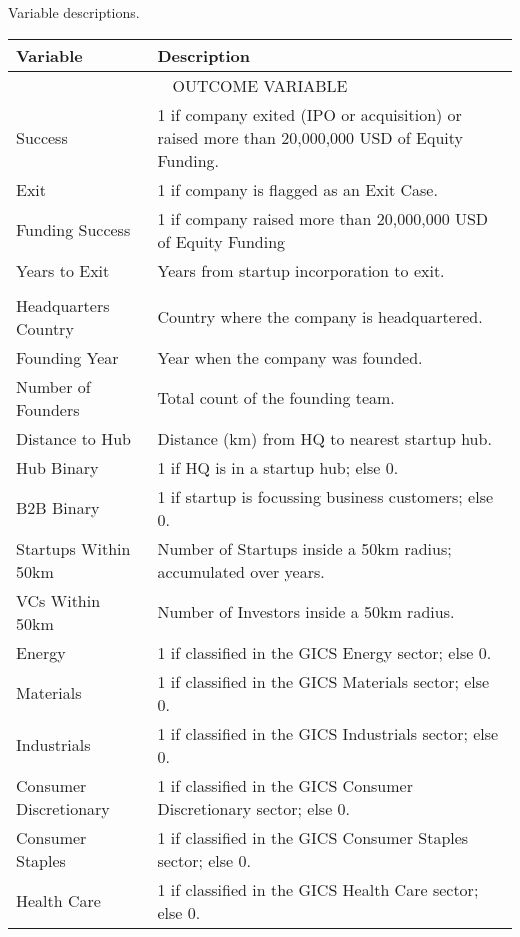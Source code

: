 \centering
{\footnotesize
\caption{Variable descriptions.}
\label{tab:var_desc}
\begin{tabular}{p{} p{}}
\toprule
Variable & Description \\
\midrule
\multicolumn{2}{c}{\tiny\textsc{OUTCOME VARIABLE}} \\
\midrule
Success & 1 if company exited (IPO or acquisition) or raised more than 20,000,000 USD of Equity Funding. \\[0.4em]
Exit & 1 if company is flagged as an Exit Case. \\[0.4em]
Funding Success & 1 if company raised more than 20,000,000 USD of Equity Funding \\[0.4em]
Years to Exit & Years from startup incorporation to exit. \\[0.4em]
\addlinespace[0.5em]
\midrule
\multicolumn{2}{c}{\tiny\textsc{FUNDAMENTAL VARIABLES}} \\
\midrule
Headquarters Country & Country where the company is headquartered. \\[0.4em]
Founding Year & Year when the company was founded. \\[0.4em]
Number of Founders & Total count of the founding team. \\[0.4em]
Distance to Hub & Distance (km) from HQ to nearest startup hub. \\[0.4em]
Hub Binary & 1 if HQ is in a startup hub; else 0. \\[0.4em]
B2B Binary & 1 if startup is focussing business customers; else 0. \\[0.4em]
Startups Within 50km & Number of Startups inside a 50km radius; accumulated over years. \\[0.4em]
VCs Within 50km & Number of Investors inside a 50km radius. \\[0.4em]
Energy & 1 if classified in the GICS Energy sector; else 0. \\[0.4em]
Materials & 1 if classified in the GICS Materials sector; else 0. \\[0.4em]
Industrials & 1 if classified in the GICS Industrials sector; else 0. \\[0.4em]
Consumer Discretionary & 1 if classified in the GICS Consumer Discretionary sector; else 0. \\[0.4em]
Consumer Staples & 1 if classified in the GICS Consumer Staples sector; else 0. \\[0.4em]
Health Care & 1 if classified in the GICS Health Care sector; else 0. \\[0.4em]

\end{tabular}}
